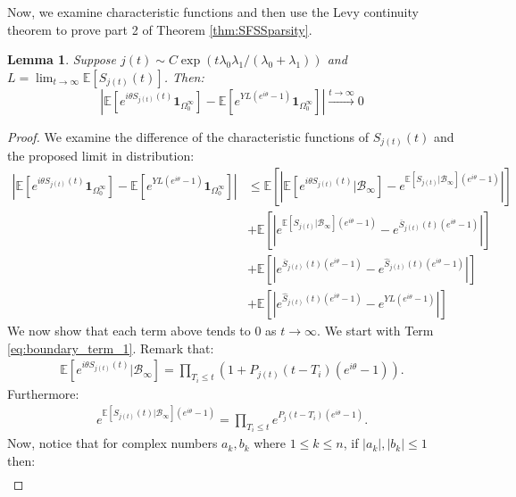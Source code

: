 \documentclass{article}
\numberwithin{equation}{section}
\newtheorem{lemma}{Lemma}
\begin{document}
Now, we examine characteristic functions and then use the Levy continuity theorem to prove part 2 of Theorem \ref{thm:SFSSparsity}.

\begin{lemma}\label{lem:sparsity_part2}
    Suppose $j(t)\sim C\exp(t\lambda_0\lambda_1/(\lambda_0+\lambda_1))$ and $L=\lim_{t\to\infty}\mathbb{E}[S_{j(t)}(t)]$. Then:
    \[\left|\mathbb{E}\left[e^{i\theta S_{j(t)}(t)}\mathbf{1}_{\Omega_0^\infty}\right]-\mathbb{E}\left[e^{YL(e^{i\theta}-1)}\mathbf{1}_{\Omega_0^\infty}\right]\right|\overset{t\to\infty}{\to} 0\]
\end{lemma}
\begin{proof}
    We examine the difference of the characteristic functions of $S_{j(t)}(t)$ and the proposed limit in distribution:
    \begin{align}
        \left|\mathbb{E}\left[e^{i\theta S_{j(t)}(t)}\mathbf{1}_{\Omega_0^\infty}\right]-\mathbb{E}\left[e^{YL(e^{i\theta}-1)}\mathbf{1}_{\Omega_0^\infty}\right]\right|&\leq \mathbb{E}\left[\left|\mathbb{E}[e^{i\theta S_{j(t)}(t)}|\mathcal{B}_\infty] -e^{\mathbb{E}[S_{j(t)}|\mathcal{B}_\infty](e^{i\theta}-1)}\right|\right]\label{eq:boundary_term_1}\\
        &+\mathbb{E}\left[\left|e^{\mathbb{E}[S_{j(t)}|\mathcal{B}_\infty](e^{i\theta}-1)}-e^{\overline{S}_{j(t)}(t)(e^{i\theta}-1)}\right|\right]\label{eq:boundary_term_2}\\
        &+\mathbb{E}\left[\left|e^{\overline{S}_{j(t)}(t)(e^{i\theta}-1)}-e^{\widehat{S}_{j(t)}(t)(e^{i\theta}-1)}\right|\right]\label{eq:boundary_term_3}\\
        &+\mathbb{E}\left[\left|e^{\widehat{S}_{j(t)}(t)(e^{i\theta}-1)}-e^{YL(e^{i\theta}-1)}\right|\right]\label{eq:boundary_term_4}
    \end{align}
    We now show that each term above tends to $0$ as $t\to\infty$. We start with Term \ref{eq:boundary_term_1}. Remark that:
    \begin{align*}
        \mathbb{E}[e^{i\theta S_{j(t)}(t)}|\mathcal{B}_\infty]=\prod_{T_i\leq t}\left(1+P_{j(t)}(t-T_i)(e^{i\theta}-1)\right).
    \end{align*}
    Furthermore:
    \begin{align*}
        e^{\mathbb{E}[S_{j(t)}(t)|\mathcal{B}_\infty](e^{i\theta}-1)}=\prod_{T_i\leq t}e^{P_j(t-T_i)(e^{i\theta}-1)}.
    \end{align*}
    Now, notice that for complex numbers $a_k,b_k$ where $1\leq k\leq n$, if $|a_k|,|b_k|\leq 1$ then:
    \begin{align*}

\end{align*}
\end{proof}
\end{document}
